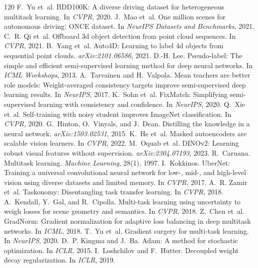 \documentclass[10pt,twocolumn]{article}
\begin{document}
\begin{thebibliography}{120}
 F.~Yu et~al. BDD100K: A diverse driving dataset for heterogeneous multitask learning. In \emph{CVPR}, 2020.
 J.~Mao et~al. One million scenes for autonomous driving: ONCE dataset. In \emph{NeurIPS Datasets and Benchmarks}, 2021.
 C.~R. Qi et~al. Offboard 3d object detection from point cloud sequences. In \emph{CVPR}, 2021.
 B.~Yang et~al. Auto4D: Learning to label 4d objects from sequential point clouds. \emph{arXiv:2101.06586}, 2021.
 D.-H. Lee. Pseudo-label: The simple and efficient semi-supervised learning method for deep neural networks. In \emph{ICML Workshops}, 2013.
 A.~Tarvainen and H.~Valpola. Mean teachers are better role models: Weight-averaged consistency targets improve semi-supervised deep learning results. In \emph{NeurIPS}, 2017.
 K.~Sohn et~al. FixMatch: Simplifying semi-supervised learning with consistency and confidence. In \emph{NeurIPS}, 2020.
 Q.~Xie et~al. Self-training with noisy student improves ImageNet classification. In \emph{CVPR}, 2020.
 G.~Hinton, O.~Vinyals, and J.~Dean. Distilling the knowledge in a neural network. \emph{arXiv:1503.02531}, 2015.
 K.~He et~al. Masked autoencoders are scalable vision learners. In \emph{CVPR}, 2022.
 M.~Oquab et~al. DINOv2: Learning robust visual features without supervision. \emph{arXiv:2304.07193}, 2023.
 R.~Caruana. Multitask learning. \emph{Machine Learning}, 28(1), 1997.
 I.~Kokkinos. UberNet: Training a universal convolutional neural network for low-, mid-, and high-level vision using diverse datasets and limited memory. In \emph{CVPR}, 2017.
 A.~R. Zamir et~al. Taskonomy: Disentangling task transfer learning. In \emph{CVPR}, 2018.
 A.~Kendall, Y.~Gal, and R.~Cipolla. Multi-task learning using uncertainty to weigh losses for scene geometry and semantics. In \emph{CVPR}, 2018.
 Z.~Chen et~al. GradNorm: Gradient normalization for adaptive loss balancing in deep multitask networks. In \emph{ICML}, 2018.
 T.~Yu et~al. Gradient surgery for multi-task learning. In \emph{NeurIPS}, 2020.
 D.~P. Kingma and J.~Ba. Adam: A method for stochastic optimization. In \emph{ICLR}, 2015.
 I.~Loshchilov and F.~Hutter. Decoupled weight decay regularization. In \emph{ICLR}, 2019.

\end{thebibliography}
\end{document}

